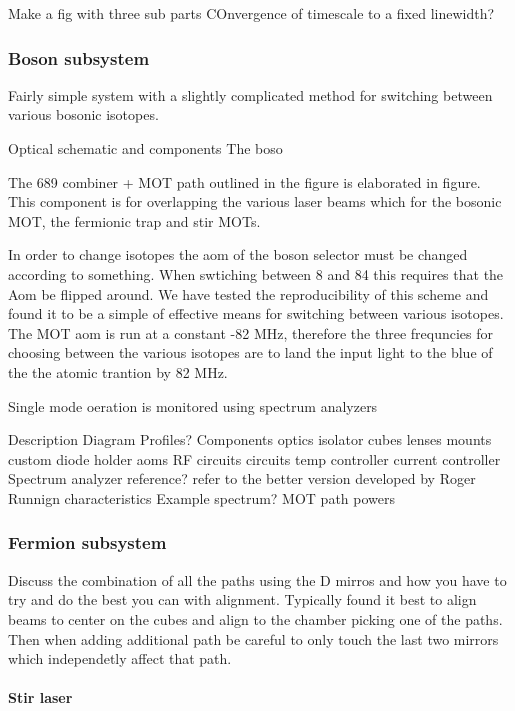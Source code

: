 Make a fig with three sub parts
COnvergence of timescale to a fixed linewidth?


\subsubsection{Boson subsystem}

Fairly simple system with a slightly complicated method for switching between various bosonic isotopes.

Optical schematic and components
The boso

The 689 combiner + MOT path outlined in the figure is elaborated in figure.
This component is for overlapping the various laser beams which for the bosonic MOT, the fermionic trap and stir MOTs.

In order to change isotopes the aom of the boson selector must be changed according to something.
When swtiching between 8 and 84 this requires that the Aom be flipped around.
We have tested the reproducibility of this scheme and found it to be a simple of effective means for switching between various isotopes.
The MOT aom is run at a constant -82 MHz, therefore the three frequncies for choosing between the various isotopes are to land the input light to the blue of the the atomic trantion by 82 MHz.

Single mode oeration is monitored using spectrum analyzers 



Description
Diagram
	Profiles?
Components
	optics
		isolator
		cubes
		lenses
	mounts
		custom diode holder
	aoms
		RF circuits
	circuits
		temp controller
		current controller
	Spectrum analyzer
		reference?
		refer to the better version developed by Roger
Runnign characteristics
	Example spectrum?
	MOT path powers


\subsubsection{Fermion subsystem}

Discuss the combination of all the paths using the D mirros and how you have to try and do the best you can with alignment. Typically found it best to align beams to center on the cubes and align to the chamber picking one of the paths. Then when adding additional path be careful to only touch the last two mirrors which independetly affect that path.

\paragraph{Stir laser}

